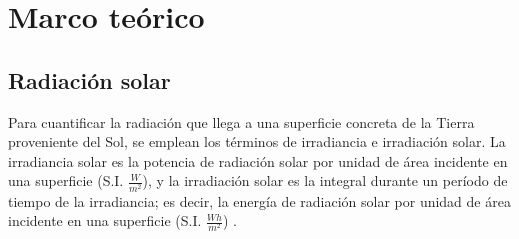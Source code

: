 \chapter{Marco teórico}
\section{Radiación solar}

Para cuantificar la radiación que llega a una superficie concreta de la Tierra proveniente del Sol, se emplean los términos de irradiancia e irradiación solar.
La irradiancia solar es la potencia de radiación solar por unidad de área incidente en una superficie (S.I. $\frac{W}{m^2}$), y la irradiación solar es la integral durante un período de tiempo de la irradiancia; es decir, la energía de radiación solar por unidad de área incidente en una superficie (S.I. $\frac{Wh}{m^2}$) \cite{perpinan2013}.

